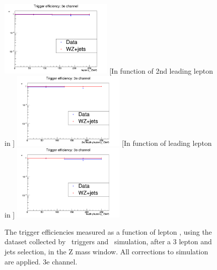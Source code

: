 \begin{figure}[tb]
	[In function of lepton \pt]{
		\includegraphics[width=0.48\textwidth]{Appendix/Figures/trigger/Triggereff/3e/triggeff_3ehistPt.png}
		\label{image:triggeff_3ehistPt.png}
	}
	[In function of 2nd leading lepton in \pt]{
		\includegraphics[width=0.48\textwidth]{Appendix/Figures/trigger/Triggereff/3e/triggeff_3ehistPt_2ndleadinglep.png}
		\label{image:triggeff_3ehistPt_2ndleadinglep.png}
	}
	[In function of leading lepton in \pt]{
		\includegraphics[width=0.48\textwidth]{Appendix/Figures/trigger/Triggereff/3e/triggeff_3ehistPt_leadinglep.png}
		\label{image:triggeff_3ehistPt_leadinglep.png}
	}
	\caption{The trigger efficiencies measured as a function of lepton \pt, using the dataset collected by \Etmis\ triggers and \WZ\ simulation, after a 3 lepton and jets selection, in the Z mass window. All corrections to simulation are applied. 3e channel.}
	\label{image:FigurestriggerTriggereff3e}
\end{figure}

